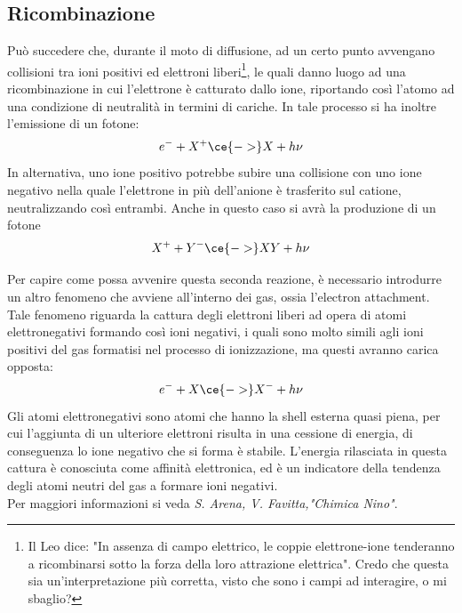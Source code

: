 \subsection{Ricombinazione}
Può succedere che, durante il moto di diffusione, ad un certo punto avvengano collisioni tra ioni positivi ed elettroni liberi\footnote{Il Leo dice: "In assenza di campo elettrico, le coppie elettrone-ione tenderanno a ricombinarsi sotto la forza della loro attrazione elettrica". Credo che questa sia un'interpretazione più corretta, visto che sono i campi ad interagire, o mi sbaglio?}, le quali danno luogo ad una ricombinazione in cui l'elettrone è catturato dallo ione, riportando così l'atomo ad una condizione di neutralità in termini di cariche. In tale processo si ha inoltre l'emissione di un fotone:
\begin{equation*}
   e^- + X^+ \ce{->} X + h\nu
\end{equation*}
In alternativa, uno ione positivo potrebbe subire una collisione con uno ione negativo nella quale l'elettrone in più dell'anione è trasferito sul catione, neutralizzando così entrambi. Anche in questo caso si avrà la produzione di un fotone
\begin{equation*}
   X^+ + Y^- \ce{->} XY + h\nu
\end{equation*}

\begin{approfondimento}
   \footnotesize Per capire come possa avvenire questa seconda reazione, è necessario introdurre un altro fenomeno che avviene all'interno dei gas, ossia l'electron attachment.\\
   Tale fenomeno riguarda la cattura degli elettroni liberi ad opera di atomi elettronegativi formando così ioni negativi, i quali sono molto simili agli ioni positivi del gas formatisi nel processo di ionizzazione, ma questi avranno carica opposta:
   \begin{equation*}
      e^- + X \ce{->} X^- + h\nu
   \end{equation*}
   Gli atomi elettronegativi sono atomi che hanno la shell esterna quasi piena, per cui l'aggiunta di un ulteriore elettroni risulta in una cessione di energia, di conseguenza lo ione negativo che si forma è stabile. L'energia rilasciata in questa cattura è conosciuta come affinità elettronica, ed è un indicatore della tendenza degli atomi neutri del gas a formare ioni negativi.%
   \\Per maggiori informazioni si veda \textit{S. Arena, V. Favitta,"Chimica Nino"}.
\end{approfondimento}

